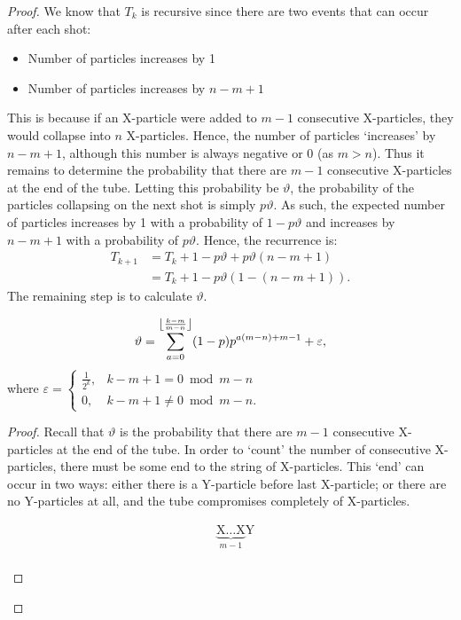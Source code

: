 \begin{proof}
  We know that $T_k$ is recursive since there are two events that can occur after each shot:
  \begin{itemize}
    \item Number of particles increases by 1
    \item Number of particles increases by $n-m+1$
  \end{itemize}
  This is because if an X-particle were added to $m-1$ consecutive X-particles, they would collapse into $n$ X-particles. Hence, the number of particles `increases' by $n-m+1$, although this number is always negative or 0 (as $m > n$). Thus it remains to determine the probability that there are $m-1$ consecutive X-particles at the end of the tube. Letting this probability be $\vartheta$, the probability of the particles collapsing on the next shot is simply $p\vartheta$. As such, the expected number of particles increases by 1 with a probability of  $1-p\vartheta$ and increases by  $n-m+1$ with a probability of $p\vartheta$. Hence, the recurrence is:
  \begin{align}
    T_{k+1} &= T_{k} + 1 - p\vartheta + p\vartheta(n-m+1) \nonumber \\
            &= T_{k} + 1 - p\vartheta(1 - (n-m+1)). \label{eq:1}
  \end{align}
  The remaining step is to calculate $\vartheta$.
  \begin{claim}
    \begin{equation*}
      \vartheta = \sum_{a=0}^{\floor*{\frac{k-m}{m-n}}} (1-p)p^{a(m-n)+m-1} + \varepsilon,
    \end{equation*}
    where $\varepsilon = \begin{cases} \frac{1}{2^k}, &k-m+1 = 0 \bmod m-n \\ 0, &k-m+1 \neq 0 \bmod m-n. \end{cases}$
  \end{claim}
  \begin{proof}
    Recall that $\vartheta$ is the probability that there are $m-1$ consecutive X-particles at the end of the tube. In order to `count' the number of consecutive X-particles, there must be some end to the string of X-particles. This `end' can occur in two ways: either there is a Y-particle before last X-particle; or there are no Y-particles at all, and the tube compromises completely of X-particles.
    \begin{figure}[H]
      \vspace{-1.5em}
      \begin{align*}
        &\underbrace{\text{X}\dots\text{X}}_{m-1}\text{Y} \tag{A}\\

\end{align*}
\end{figure}
\end{proof}
\end{proof}
